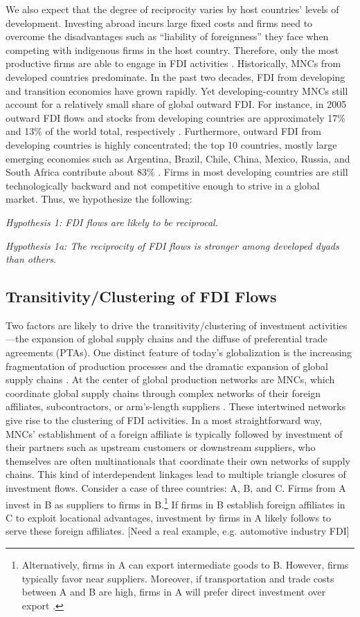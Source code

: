 \documentclass{article}
\begin{document}
We also expect that the degree of reciprocity varies by host countries' levels of development. Investing abroad incurs large fixed costs and firms need to overcome the disadvantages such as ``liability of foreignness'' they face when competing with indigenous firms in the host country. Therefore, only the most productive firms are able to engage in FDI activities \citep{Melitz:2003,Helpman_et_al:2004}. Historically, MNCs from developed countries predominate. In the past two decades, FDI from developing and transition economies have grown rapidly. Yet developing-country MNCs still account for a relatively small share of global outward FDI. For instance, in 2005 outward FDI flows and stocks from developing countries are approximately 17\% and 13\% of the world total, respectively \citep{UNCTAD:2006}. Furthermore, outward FDI from developing countries is highly concentrated; the top 10 countries, mostly large emerging economies such as Argentina, Brazil, Chile, China, Mexico, Russia, and South Africa contribute about 83\% \citep{UNCTAD:2006}. Firms in most developing countries are still technologically backward and not competitive enough to strive in a global market. Thus, we hypothesize the following:

\textit{Hypothesis 1: FDI flows are likely to be reciprocal.}

\textit{Hypothesis 1a: The reciprocity of FDI flows is stronger among developed dyads than others.}

\subsection{Transitivity/Clustering of FDI Flows}
Two factors are likely to drive the transitivity/clustering of investment activities---the expansion of global supply chains and the diffuse of preferential trade agreements (PTAs).  One distinct feature of today's globalization is the increasing fragmentation of production processes and the dramatic expansion of global supply chains \citep{UNCTAD:2013}. At the center of global production networks are MNCs, which coordinate global supply chains through complex networks of their foreign affiliates, subcontractors, or arm's-length suppliers \citep[xxii]{UNCTAD:2013}. These intertwined networks give rise to the clustering of FDI activities. In a most straightforward way, MNCs' establishment of a foreign affiliate is typically followed by investment of their partners such as upstream customers or downstream suppliers, who themselves are often multinationals that coordinate their own networks of supply chains. This kind of interdependent linkages lead to multiple triangle closures of investment flows. Consider a case of three countries: A, B, and C. Firms from A invest in B as suppliers to firms in B.\footnote{Alternatively, firms in A can export intermediate goods to B. However, firms typically favor near suppliers. Moreover, if transportation and trade costs between A and B are high, firms in A will prefer direct investment over export \citep{Carr_et_al:2001}. } If firms in B establish foreign affiliates in C to exploit locational advantages, investment by firms in A likely follows to serve these foreign affiliates. [Need a real example, e.g. automotive industry FDI]
\end{document}
